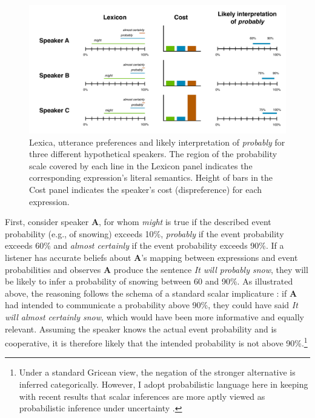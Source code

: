 \begin{figure}
\center
\includegraphics[width=\textwidth]{plots/fig-1-implicatures.pdf}
\caption{Lexica, utterance preferences and likely interpretation of \textit{probably} for three different hypothetical speakers. The region of the probability scale covered by each line in the Lexicon panel indicates the corresponding expression's literal semantics. Height of bars in the Cost panel indicates the speaker's cost (dispreference) for each expression.}
\label{fig:inference-example}
\end{figure}

First, consider speaker {\bf A}, for whom \textit{might} is true if the described event probability (e.g., of snowing) exceeds 10\%, 
\textit{probably} if the event probability exceeds 60\% and \textit{almost certainly}  if the event probability exceeds 90\%.  
If a listener has accurate beliefs about {\bf A}'s mapping between expressions and event probabilities and observes {\bf A} 
produce the sentence \emph{It will probably snow}, they will be likely to infer a probability of snowing between 60 and 90\%. 
As illustrated above, the reasoning follows the schema of a standard scalar implicature \cite{Grice1975, Horn1984}: if  {\bf A} 
had intended to communicate a probability above 90\%, they could have said \emph{It will almost certainly snow}, which would 
have been more informative and equally relevant. Assuming the speaker knows the actual event probability and is cooperative, 
it is therefore likely that the intended probability is not above 90\%.\footnote{Under a standard Gricean view, the negation of the 
stronger alternative is inferred categorically. However, I adopt probabilistic language here in keeping with recent results that scalar 
inferences are more aptly viewed as probabilistic inference under uncertainty \cite{Goodman2013}.} 

